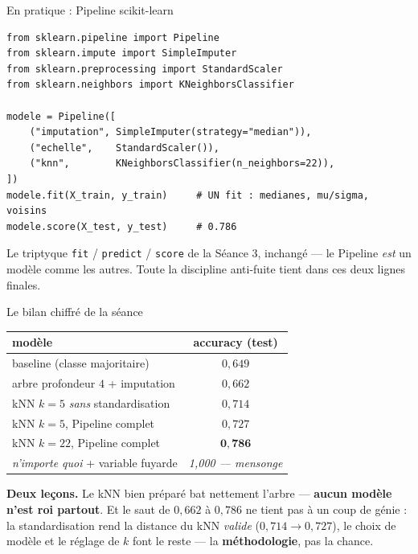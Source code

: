 \documentclass[aspectratio=169,11pt]{beamer}
\begin{document}
\begin{frame}[fragile]{En pratique : Pipeline scikit-learn}
\begin{lstlisting}
from sklearn.pipeline import Pipeline
from sklearn.impute import SimpleImputer
from sklearn.preprocessing import StandardScaler
from sklearn.neighbors import KNeighborsClassifier

modele = Pipeline([
    ("imputation", SimpleImputer(strategy="median")),
    ("echelle",    StandardScaler()),
    ("knn",        KNeighborsClassifier(n_neighbors=22)),
])
modele.fit(X_train, y_train)     # UN fit : medianes, mu/sigma, voisins
modele.score(X_test, y_test)     # 0.786
\end{lstlisting}
{\small Le triptyque \texttt{fit} / \texttt{predict} / \texttt{score} de la Séance 3, inchangé — le Pipeline \emph{est} un modèle comme les autres. Toute la discipline anti-fuite tient dans ces deux lignes finales.}
\end{frame}

\begin{frame}{Le bilan chiffré de la séance}
\begin{ucadex}
{\small \begin{center}\begin{tabular}{l c}
modèle & accuracy (test)\\\hline
baseline (classe majoritaire) & $0{,}649$\\
arbre profondeur $4$ + imputation & $0{,}662$\\
kNN $k=5$ \emph{sans} standardisation & $0{,}714$\\
kNN $k=5$, Pipeline complet & $0{,}727$\\
kNN $k=22$, Pipeline complet & $\mathbf{0{,}786}$\\
\emph{n'importe quoi} + variable fuyarde & \emph{1{,}000 — mensonge}\\
\end{tabular}\end{center}}
\end{ucadex}
{\small \textbf{Deux leçons.} Le kNN bien préparé bat nettement l'arbre — \textbf{aucun modèle n'est roi partout}. Et le saut de $0{,}662$ à $0{,}786$ ne tient pas à un coup de génie : la standardisation rend la distance du kNN \emph{valide} ($0{,}714 \to 0{,}727$), le choix de modèle et le réglage de $k$ font le
reste — la \textbf{méthodologie}, pas la chance.}
\end{frame}
\end{document}
